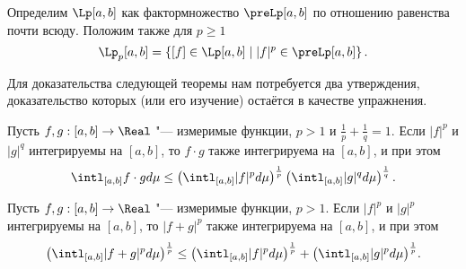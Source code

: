 \documentclass[main]{subfiles}
\begin{document}
Определим \( \Lp[a, b] \) как
фактормножество \( \preLp[a, b] \)
по отношению равенства почти всюду.
Положим также для \( p \ge 1 \)
\[
  \Lp_p[a, b] = \left\{
    [f] \in \Lp[a, b]
    \mid
    |f|^p \in \preLp[a, b]
  \right\}.
\]

Для доказательства следующей теоремы
нам потребуется два утверждения,
доказательство которых (или его изучение)
остаётся в качестве упражнения.

\begin{proposition}
  Пусть \( f, g : [a, b] \to \Real \) "---
  измеримые функции, \( p > 1 \) и
  \( \frac1p + \frac1q = 1 \).
  Если \( |f|^p \) и \( |g|^q \) интегрируемы на \( [a, b] \),
  то \( f \cdot g \) также интегрируема на \( [a, b] \),
  и при этом
  \[
    \intl_{[a, b]} f \cdot g d\mu \le
    \left( \intl_{[a,b]} |f|^p d\mu \right)^{\frac1p}
    \left( \intl_{[a,b]} |g|^q d\mu \right)^{\frac1q}.
  \]
\end{proposition}

\begin{proposition}
  Пусть \( f, g : [a, b] \to \Real \) "---
  измеримые функции, \( p > 1 \).
  Если \( |f|^p \) и \( |g|^p \) интегрируемы на \( [a, b] \),
  то \( |f + g|^p \) также интегрируема на \( [a, b] \),
  и при этом
  \[
    {\left( \intl_{[a, b]} |f + g|^p d\mu \right)}^{\frac1p} \le
    {\left( \intl_{[a,b]} |f|^p d\mu \right)}^{\frac1p}
    +
    {\left( \intl_{[a,b]} |g|^p d\mu \right)}^{\frac1p}.
  \]
\end{proposition}
\end{document}
